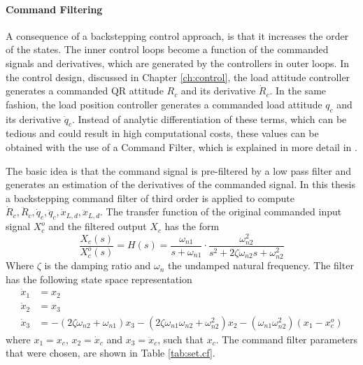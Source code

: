 \paragraph{Command Filtering}
A consequence of a backstepping control approach, is that it increases the order of the states. The inner control loops become a function of the commanded signals and derivatives, which are generated by the controllers in outer loops.
In the control design, discussed in Chapter \ref{ch:control}, the load attitude controller generates a commanded QR attitude $ R_c $ and its derivative $ \dot{R}_c $. In the same fashion, the load position controller generates a commanded load attitude $ q_c $ and its derivative $ \dot{q}_c $. 
Instead of analytic differentiation of these terms, which can be tedious and could result in high computational costs, these values can be obtained with the use of a Command Filter, which is explained in more detail in \cite{Farrell2008}. 

The basic idea is that the command signal is pre-filtered by a low pass filter and generates an estimation of the derivatives of the commanded signal. 
In this thesis a backstepping command filter of third order is applied to compute $ \dot{R}_c, \ddot{R}_c,\dot{q}_c, \ddot{q}_c,\dot{x}_{L,d},\ddot{x}_{L,d} $. 
The transfer function of the original commanded input signal $ X_c^o $ and the filtered output $ X_c $ has the form
\begin{equation}\label{key}
\frac{X_c(s)}{X_c^o(s)}=H(s)=\frac{\omega_{n1}}{s+\omega_{n1}}\cdot\frac{\omega_{n2}^2}{s^2+2\zeta\omega_{n2}s+\omega_{n2}^2}
\end{equation}
Where $ \zeta $ is the damping ratio and $ \omega_n $ the undamped natural frequency. 
The filter has the following state space representation
\begin{equation}\label{key}
\begin{aligned}
\dot{x}_1 &= x_2\\ %
\dot{x}_2 &= x_3\\ %
\dot{x}_3 &= -(2\zeta \omega_{n2}+\omega_{n1})x_3-(2\zeta\omega_{n1}\omega_{n2}+\omega_{n2}^2)x_2-(\omega_{n1}\omega_{n2}^2)(x_1-x_c^o)
\end{aligned}
\end{equation}
where $ x_1 = x_c$, $ x_2 = \dot{x}_c$ and $ x_3 = \ddot{x}_c$, such that $ x_c $. The command filter parameters that were chosen, are shown in Table \ref{tab:set.cf}.

